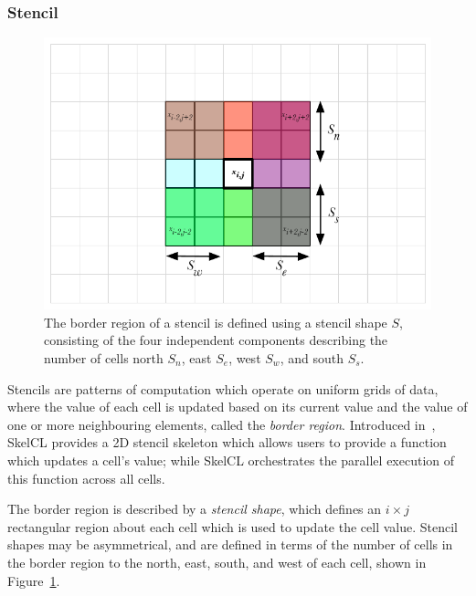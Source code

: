 \subsubsection{Stencil}

\begin{figure}
\centering
\includegraphics[width=.6\textwidth]{img/stencil-shape}
\caption{%
  The border region of a stencil is defined using a stencil shape $S$,
  consisting of the four independent components describing the number
  of cells north $S_n$, east $S_e$, west $S_w$, and south $S_s$.%
}
\label{fig:stencil-shape}
\end{figure}

Stencils are patterns of computation which operate on uniform grids of
data, where the value of each cell is updated based on its current
value and the value of one or more neighbouring elements, called the
\emph{border region}. Introduced in~\cite{Breuer2014}, SkelCL provides
a 2D stencil skeleton which allows users to provide a function which
updates a cell's value; while SkelCL orchestrates the parallel
execution of this function across all cells.

The border region is described by a \emph{stencil shape}, which
defines an $i \times j$ rectangular region about each cell which is
used to update the cell value. Stencil shapes may be asymmetrical, and
are defined in terms of the number of cells in the border region to
the north, east, south, and west of each cell, shown in
Figure~\ref{fig:stencil-shape}.

